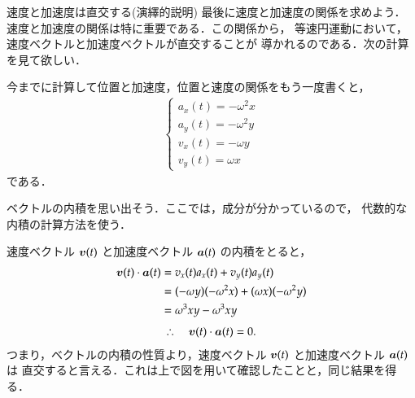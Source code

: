                 \begin{memo}{速度と加速度は直交する(演繹的説明)}
                    最後に速度と加速度の関係を求めよう．
                    速度と加速度の関係は特に重要である．この関係から，
                    等速円運動において，速度ベクトルと加速度ベクトルが直交することが
                    導かれるのである．次の計算を見て欲しい．

                        今までに計算して位置と加速度，位置と速度の関係をもう一度書くと，
                            \begin{align*}
                                \begin{cases}
                                \displaystyle a_{x}(t) = -\omega^{2}x \\
                                \displaystyle a_{y}(t) = -\omega^{2} y \\
                                \displaystyle v_{x}(t) = -\omega y \\
                                \displaystyle v_{y}(t) = \omega x
                                \end{cases}
                            \end{align*}
                        である．

                        ベクトルの内積を思い出そう．ここでは，成分が分かっているので，
                        代数的な内積の計算方法を使う．

                        速度ベクトル $\boldsymbol{v}(t)$ と加速度ベクトル $\boldsymbol{a}(t)$ の内積をとると，
                            \begin{align*}
                                \boldsymbol{v}(t) \cdot \boldsymbol{a}(t) &= v_{x}(t)a_{x}(t) + v_{y}(t)a_{y}(t) \\
                                                    &= ( -\omega y ) ( -\omega^{2}x ) + ( \omega x ) ( -\omega^{2} y ) \\
                                                    &= \omega^{3}xy - \omega^{3}xy
                            \end{align*}
                            \begin{align}
                                \therefore\quad
                                \boldsymbol{v}(t) \cdot \boldsymbol{a}(t) = 0.
                            \end{align}
                        つまり，ベクトルの内積の性質より，速度ベクトル $\boldsymbol{v}(t)$ と加速度ベクトル $\boldsymbol{a}(t)$ は
                        直交すると言える．これは上で図を用いて確認したことと，同じ結果を得る．
                    \end{memo}


